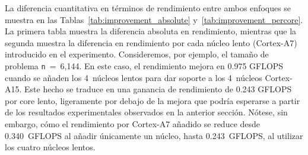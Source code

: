 %
%

La diferencia cuantitativa en términos de rendimiento entre ambos enfoques se muestra
en las Tablas~\ref{tab:improvement_absolute} y~\ref{tab:improvement_percore}. 
La primera tabla muestra la diferencia absoluta en rendimiento, mientras que la segunda 
muestra la diferencia en rendimiento por cada núcleo lento (Cortex-A7) introducido en
el experimento. Consideremos, por ejemplo, el tamaño de problema {\tt n}~=~6,144. 
En este caso, el rendimiento mejora en 0.975 GFLOPS cuando se añaden los 4~núcleos lentos para 
dar soporte a los 4~núcleos Cortex-A15. Este hecho se traduce en una ganancia de rendimiento de
0.243 GFLOPS por core lento, ligeramente por debajo de la mejora que podría esperarse a partir de
los resultados experimentales observados en la anterior sección. Nótese, sin embargo, cómo el 
rendimiento por Cortex-A7 añadido se reduce desde 0.340~GFLOPS al añadir únicamente un núcleo,
hasta 0.243~GFLOPS, al utilizar los cuatro núcleos lentos.

\newcommand{\fg}[1]{\textcolor{ForestGreen}{#1}} %
\newcommand{\br}[1]{\textcolor{BrickRed}{#1}} %

